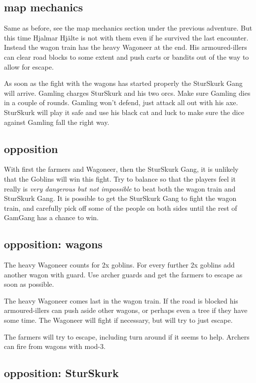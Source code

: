 \subsection*{map mechanics}

Same as before, see the map mechanics section under the previous adventure. But this time Hjalmar Hjälte is not with them even if he survived the last encounter. Instead the wagon train has the heavy Wagoneer at the end. His armoured-illers can clear road blocks to some extent and push carts or bandits out of the way to allow for escape.

As soon as the fight with the wagons has started properly the SturSkurk Gang will arrive. Gamling charges SturSkurk and his two orcs. Make sure Gamling dies in a couple of rounds. Gamling won't defend, just attack all out with his axe. SturSkurk will play it safe and use his black cat and luck to make sure the dice against Gamling fall the right way.


\subsection*{opposition}

With first the farmers and Wagoneer, then the SturSkurk Gang, it is unlikely that the Goblins will win this fight. Try to balance so that the players feel it really is \emph{very dangerous but not impossible} to beat both the wagon train and SturSkurk Gang. It is possible to get the SturSkurk Gang to fight the wagon train, and carefully pick off some of the people on both sides until the rest of GamGang has a chance to win.


\subsection*{opposition: wagons}

The heavy Wagoneer counts for 2x goblins. For every further 2x goblins add another wagon with guard. Use archer guards and get the farmers to escape as soon as possible.

The heavy Wagoneer comes last in the wagon train. If the road is blocked his armoured-illers can push aside other wagons, or perhaps even a tree if they have some time. The Wagoneer will fight if necessary, but will try to just escape.

The farmers will try to escape, including turn around if it seems to help. Archers can fire from wagons with mod-3.


\subsection*{opposition: SturSkurk}

